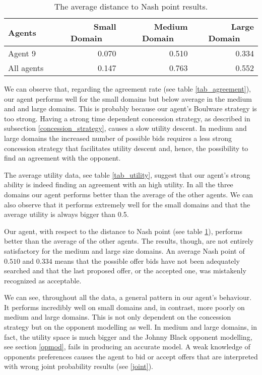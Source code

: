 \documentclass[runningheads]{llncs}
\begin{document}
\begin{table}[H]
\caption{The average distance to Nash point results.}\label{tab_nash}
\begin{tabular}{|l|r|r|r|}
\hline
\textbf{Agents}~~~ & \textbf{Small Domain}~~~ &
\textbf{Medium Domain}~~~ & \textbf{Large Domain}~~~\\
\hline
Agent 9 & 0.070 & 0.510 & 0.334 \\
\hline
All agents & 0.147 & 0.763 & 0.552 \\
\hline
\end{tabular}
\end{table}

We can observe that, regarding the agreement rate (see table \ref{tab_agreement}), our agent
performs well for the small domains but below average
in the medium and and large domains. This is probably because our
agent's Boulware strategy is too strong. Having a strong time
dependent concession strategy, as
described in subsection \ref{concession_strategy}, causes a slow
utility descent. In medium and large domains the increased number of
possible bids requires a less strong concession strategy that
facilitates utility descent and, hence, the possibility to find an
agreement with the opponent.

The average utility data, see table \ref{tab_utility}, suggest that
our agent's strong ability is indeed finding an agreement with an high
utility. In all the three domains our agent performs better than the
average of the other agents. We can also observe that it performs
extremely well for the small domains and that the average utility is
always bigger than 0.5.

Our agent, with respect to the distance to Nash point (see table
\ref{tab_nash}), performs better than the average of the other
agents. The results, though, are not entirely satisfactory for the
medium and large size domains. An average Nash point of $0.510$ and
$0.334$ means that the possible offer bids have not been adequately
searched and that the last proposed offer, or the accepted one, was
mistakenly recognized as acceptable.

We can see, throughout all the data, a general pattern in our agent's
behaviour. It performs incredibly well on small domains and, in
contrast, more poorly on medium and large domains. This is not only
dependent on the concession strategy but on the opponent modelling as
well. In medium and large domains, in fact, the utility space is much
bigger and the Johnny Black opponent modelling, see section
\ref{opmod}, fails in producing an accurate model. A weak
knowledge of opponents preferences causes the agent to bid or accept
offers that are interpreted with wrong joint probability results (see
\ref{joint}).
\end{document}
